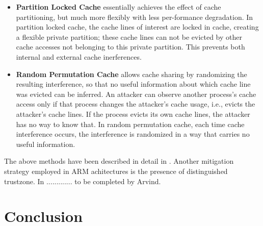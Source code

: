 \documentclass[twocolumn]{IEEEtran}
\begin{document}
\begin{itemize}
\item \textbf {Partition Locked Cache} essentially achieves the effect of cache partitioning, but much more flexibly with less per-formance degradation. In partition locked cache, the cache lines of interest are locked in cache, creating a flexible private partition; these cache lines can not be evicted by other cache accesses not belonging to this private partition. This prevents both internal and external cache inerferences.

\item \textbf {Random Permutation Cache} allows cache sharing by randomizing the resulting interference, so that no useful information about which cache line was evicted can be inferred. An attacker can observe another process’s cache access only if that process changes the attacker’s cache usage, i.e., evicts the attacker’s cache lines. If the process evicts its own cache lines, the attacker has no way to know that.  In random permutation cache, each time cache interference occurs, the interference is randomized in a way that carries no useful information. 

\end{itemize}

The above methods have been described in detail in \cite{wang2007new}. Another mitigation strategy employed in ARM achitectures is the presence of distinguished trustzone. In ............. to be completed by Arvind.


\section { Conclusion }






\end{document}
